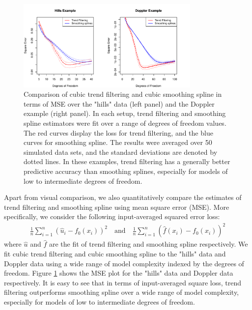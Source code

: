\documentclass[a4paper]{article}
\begin{document}
\begin{figure}[t]
\centering
\includegraphics[width = 0.8\textwidth]{Figures/Figure6.pdf}
\caption{Comparison of cubic trend filtering and cubic smoothing spline in terms of MSE over the "hills" data (left panel) and the Doppler example (right panel). In each setup, trend filtering and smoothing spline estimators were fit over a range of degrees of freedom values. The red curves display the loss for trend filtering, and the blue curves for smoothing spline. The results were averaged over 50 simulated data sets, and the standard deviations are denoted by dotted lines. In these examples, trend filtering has a generally better predictive accuracy than smoothing splines, especially for models of low to intermediate degrees of freedom.}
\label{fig:Figure6_mse}
\end{figure}

Apart from visual comparison, we also quantitatively compare the estimates of trend filtering and smoothing spline using mean square error (MSE). More specifically, we consider the following input-averaged squared error loss:
\begin{align}
\frac{1}{n}\sum_{i=1}^n (\hat{u}_i - f_0(x_i))^2 \quad \text{and}\quad \frac{1}{n}\sum_{i=1}^n (\hat{f}(x_i) - f_0(x_i))^2
\label{eq:avg_squareloss}
\end{align}
where $\hat{u}$ and $\hat{f}$ are the fit of trend filtering and smoothing spline respectively. We fit cubic trend filtering and cubic smoothing spline to the "hills" data and Doppler data using a wide range of model complexity indexed by the degrees of freedom. Figure \ref{fig:Figure6_mse} shows the MSE plot for the "hills" data and Doppler data respectively. It is easy to see that in terms of input-averaged square loss, trend filtering outperforms smoothing spline over a wide range of model complexity, especially for models of low to intermediate degrees of freedom. 
\end{document}
